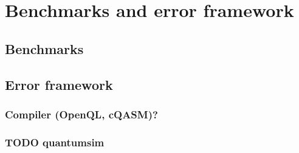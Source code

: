 
\chapter*{Benchmarks and error framework}
\label{sec:org52451b7}
\section*{Benchmarks}
\label{sec:org5ef0678}
\section*{Error framework}
\label{sec:org28a56e7}
\subsection*{Compiler (OpenQL, cQASM)?}
\label{sec:org888ac54}
\subsection*{{\bfseries\sffamily TODO} quantumsim}
\label{sec:org8970155}


